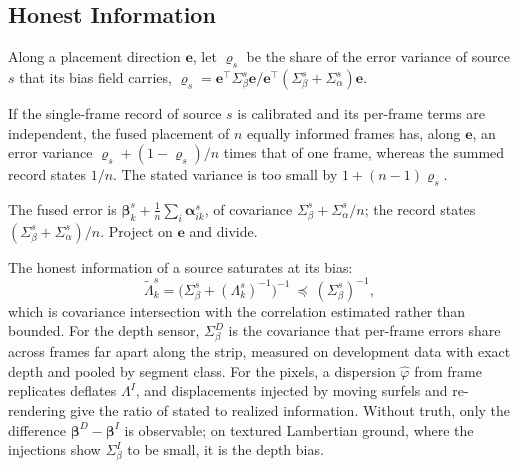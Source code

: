 \subsection{Honest Information}
\label{sec:method:honest}
Along a placement direction $\mathbf e$, let $\varrho_s$ be the share of the error variance of
source $s$ that its bias field carries,
$\varrho_s=\mathbf e^{\top}\Sigma^{s}_{\beta}\mathbf e/\mathbf e^{\top}(\Sigma^{s}_{\beta}+\Sigma^{s}_{\alpha})\mathbf e$.
\begin{proposition}\label{prop:law}
If the single-frame record of source $s$ is calibrated and its per-frame terms are independent, the fused
placement of $n$ equally informed frames has, along $\mathbf e$, an error variance
$\varrho_s+(1-\varrho_s)/n$ times that of one frame, whereas the summed record states $1/n$. The stated
variance is too small by $1+(n-1)\varrho_s$.
\end{proposition}
\begin{IEEEproof}
The fused error is $\boldsymbol\beta^{s}_k+\frac1n\sum_i\boldsymbol\alpha^{s}_{ik}$, of covariance
$\Sigma^{s}_\beta+\Sigma^{s}_\alpha/n$; the record states $(\Sigma^{s}_\beta+\Sigma^{s}_\alpha)/n$.
Project on $\mathbf e$ and divide.
\end{IEEEproof}
\noindent The honest information of a source saturates at its bias:
\begin{equation}
\tilde\Lambda^{s}_{k}=\bigl(\Sigma^{s}_\beta+(\Lambda^{s}_{k})^{-1}\bigr)^{-1}\ \preceq\ (\Sigma^{s}_\beta)^{-1},
\label{eq:saturation}
\end{equation}
which is covariance intersection \cite{fus_julier_ci} with the correlation estimated rather than bounded.
For the depth sensor, $\Sigma^{D}_\beta$ is the covariance that per-frame errors share across frames far
apart along the strip, measured on development data with exact depth and pooled by segment class. For the
pixels, a dispersion $\hat\varphi$ from frame replicates deflates $\Lambda^{I}$, and displacements injected
by moving surfels and re-rendering give the ratio of stated to realized information. Without truth, only
the difference $\boldsymbol\beta^{D}-\boldsymbol\beta^{I}$ is observable; on textured Lambertian ground,
where the injections show $\Sigma^{I}_\beta$ to be small, it is the depth bias.

